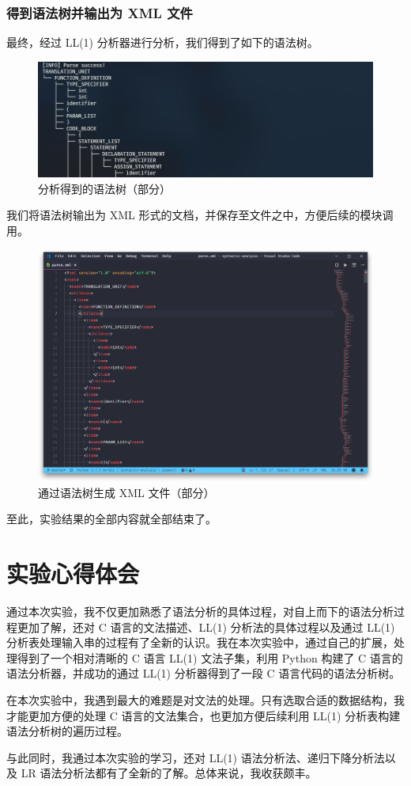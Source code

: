 \documentclass[UTF8]{ctexart}
\begin{document}
\subsubsection{得到语法树并输出为 XML 文件}
最终，经过 LL(1) 分析器进行分析，我们得到了如下的语法树。

\begin{figure}[H]
  \includegraphics[width=\linewidth]{images/parsetree.png}
  \caption{分析得到的语法树（部分）}
  \label{fig:figure7}
\end{figure}

我们将语法树输出为 XML 形式的文档，并保存至文件之中，方便后续的模块调用。

\begin{figure}[H]
  \includegraphics[width=\linewidth]{images/xml.png}
  \caption{通过语法树生成 XML 文件（部分）}
  \label{fig:figure8}
\end{figure}

至此，实验结果的全部内容就全部结束了。

\section{实验心得体会}
通过本次实验，我不仅更加熟悉了语法分析的具体过程，对自上而下的语法分析过程更加了解，还对 C 语言的文法描述、LL(1) 分析法的具体过程以及通过 LL(1) 分析表处理输入串的过程有了全新的认识。我在本次实验中，通过自己的扩展，处理得到了一个相对清晰的 C 语言 LL(1) 文法子集，利用 Python 构建了 C 语言的语法分析器，并成功的通过 LL(1) 分析器得到了一段 C 语言代码的语法分析树。

在本次实验中，我遇到最大的难题是对文法的处理。只有选取合适的数据结构，我才能更加方便的处理 C 语言的文法集合，也更加方便后续利用 LL(1) 分析表构建语法分析树的遍历过程。

与此同时，我通过本次实验的学习，还对 LL(1) 语法分析法、递归下降分析法以及 LR 语法分析法都有了全新的了解。总体来说，我收获颇丰。
\end{document}
